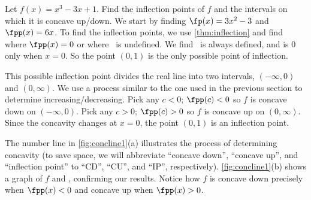 \begin{example}\label{ex_conc1}
Let $f(x)=x^3-3x+1$. Find the inflection points of $f$ and the intervals on which it is concave up/down.
\solution
We start by finding $\fp(x)=3x^2-3$ and $\fpp(x)=6x$.  To find the inflection points, we use \autoref{thm:inflection} and find where $\fpp(x)=0$ or where \fpp\ is undefined. We find \fpp\ is always defined, and is 0 only when $x=0$. So the point $(0,1)$ is the only possible point of inflection.


This possible inflection point divides the real line into two intervals, $(-\infty,0)$ and $(0,\infty)$. We use a process similar to the one used in the previous section to determine increasing/decreasing. Pick any $c<0$; $\fpp(c)<0$ so $f$ is concave down on $(-\infty,0)$. Pick any $c>0$; $\fpp(c)>0$ so $f$ is concave up on $(0,\infty)$. Since the concavity changes at $x=0$, the point $(0,1)$ is an inflection point.

The number line in \autoref{fig:concline1}(a) illustrates the process of determining concavity (to save space, we will abbreviate ``concave down'', ``concave up'', and ``inflection point'' to ``CD'', ``CU'', and ``IP'', respectively). \autoref{fig:concline1}(b) shows a graph of $f$ and \fpp, confirming our results. Notice how $f$ is concave down precisely when $\fpp(x)<0$ and concave up when $\fpp(x)>0$.
\end{example}

